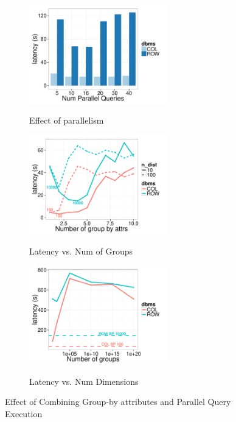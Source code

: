 \begin{figure}[t]
	\centering
	\begin{subfigure}{0.33\linewidth}
		\centering
		{\includegraphics[width=6cm] {Images/parallel_noop.pdf}}
		\caption{Effect of parallelism}
		\label{fig:parallelism}
	\end{subfigure}
	\begin{subfigure}{0.33\linewidth}
		\centering
		{\includegraphics[width=6cm] {Images/multi_gb_same.pdf}}
		\caption{Latency vs. Num of Groups}
		\label{fig:multi_gb_same}
	\end{subfigure}
	\begin{subfigure}{0.33\linewidth}
		\centering
		{\includegraphics[width=6cm] {Images/multi_gb.pdf}}
		\caption{Latency vs. Num Dimensions}
		\label{fig:multi_gb_bp}
	\end{subfigure}
	\vspace{-10pt}
	\caption{Effect of Combining Group-by attributes and Parallel Query Execution}
	\label{fig:bank_perf}
	\vspace{-10pt}
\end{figure}


